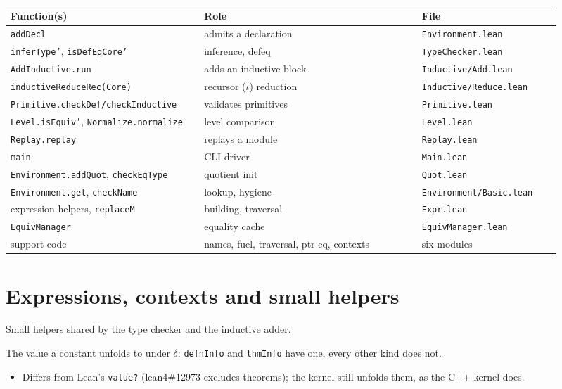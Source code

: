 \par\smallskip\noindent
\begin{tabular}{p{0.32\linewidth}p{0.36\linewidth}p{0.23\linewidth}}
\toprule
Function(s) & Role & File \\
\midrule
\texttt{addDecl} & admits a declaration & \texttt{Environment.lean} \\
\texttt{inferType'}, \texttt{isDefEqCore'} & inference, defeq & \texttt{TypeChecker.lean} \\
\texttt{AddInductive.run} & adds an inductive block & \texttt{Inductive/Add.lean} \\
\texttt{inductiveReduceRec(Core)} & recursor ($\iota$) reduction & \texttt{Inductive/Reduce.lean} \\
\texttt{Primitive.checkDef/checkInductive} & validates primitives & \texttt{Primitive.lean} \\
\texttt{Level.isEquiv'}, \texttt{Normalize.normalize} & level comparison & \texttt{Level.lean} \\
\texttt{Replay.replay} & replays a module & \texttt{Replay.lean} \\
\texttt{main} & CLI driver & \texttt{Main.lean} \\
\texttt{Environment.addQuot}, \texttt{checkEqType} & quotient init & \texttt{Quot.lean} \\
\texttt{Environment.get}, \texttt{checkName} & lookup, hygiene & \texttt{Environment/Basic.lean} \\
expression helpers, \texttt{replaceM} & building, traversal & \texttt{Expr.lean} \\
\texttt{EquivManager} & equality cache & \texttt{EquivManager.lean} \\
support code & names, fuel, traversal, ptr eq, contexts & six modules \\
\bottomrule
\end{tabular}\par\smallskip

\section{Expressions, contexts and small helpers}

Small helpers shared by the type checker and the inductive adder.

\begin{definition}
\label{def:kernel-delta-value}
\leanok
{}

 The value a constant unfolds to under $\delta$: \texttt{defnInfo} and
\texttt{thmInfo} have one, every other kind does not.
\begin{itemize}
\item {} Differs from Lean's \texttt{value?} (lean4\#12973 excludes theorems); the
kernel still unfolds them, as the C++ kernel does.
\end{itemize}
\end{definition}

